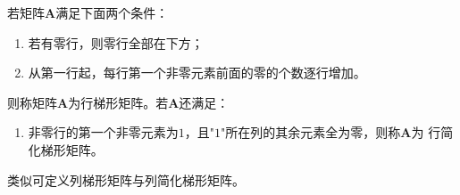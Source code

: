 \begin{definition}[梯形矩阵]
    若矩阵$\boldsymbol{A}$满足下面两个条件：
    \begin{enumerate}[(1)]
        \item 若有零行，则零行全部在下方；
        \item 从第一行起，每行第一个非零元素前面的零的个数逐行增加。
    \end{enumerate}
    则称矩阵$\boldsymbol{A}$为{\heiti 行梯形矩阵}。若$\boldsymbol{A}$还满足：
    \begin{enumerate}[(3)]
        \item 非零行的第一个非零元素为$1$，且"$1$"所在列的其余元素全为零，则称$\boldsymbol{A}$为
        {\heiti 行简化梯形矩阵}。
    \end{enumerate}

    类似可定义{\heiti 列梯形矩阵}与{\heiti 列简化梯形矩阵}。
\end{definition}








